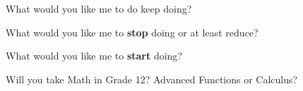 \documentclass[12pt]{article} %
\begin{document}
\begin{qstn}
  What would you like me to do keep doing?
\end{qstn}
\vspace*{3cm}

\begin{qstn}
  What would you like me to \textbf{stop} doing or at least reduce?
\end{qstn}
\vspace*{3cm}

\begin{qstn}
  What would you like me to \textbf{start} doing?
\end{qstn}
\vspace*{3cm}

\begin{qstn}
  Will you take Math in Grade 12? Advanced Functions or Calculus?
\end{qstn}
\end{document}
